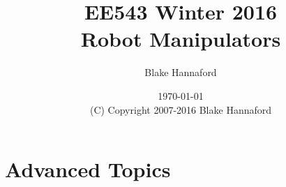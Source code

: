 \documentclass[oneside]{book}
\begin{document}
\setpagewiselinenumbers
\modulolinenumbers[5]

\setcounter{chapter}{0}



 \title{EE543  Winter 2016\\Robot Manipulators}

 \author{Blake Hannaford}

 \date{\today\\(C) Copyright 2007-2016 Blake Hannaford}

 \maketitle

\tableofcontents

\mainmatter

\linenumbers
% 
% 
%
\setcounter{chapter}{10}
\setcounter{part}{1}
\part{Advanced Topics}






% 

% 

%
\label{LastPage}
\end{document}
